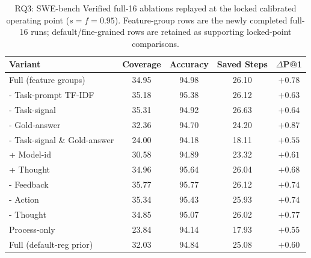 
\begin{table}[t]
\centering
\caption{RQ3: SWE-bench Verified full-16 ablations replayed at the locked calibrated operating point ($s=f=0.95$). Feature-group rows are the newly completed full-16 runs; default/fine-grained rows are retained as supporting locked-point comparisons.}
\label{tab:rq3_ablation}
\small
\setlength{\tabcolsep}{4pt}
\begin{tabular}{l c c c c}
\toprule
Variant & Coverage & Accuracy & Saved Steps & $\Delta$P@1 \\
\midrule
Full (feature groups) & 34.95 & 94.98 & 26.10 & $+0.78$ \\
- Task-prompt TF-IDF & 35.18 & 95.38 & 26.12 & $+0.63$ \\
- Task-signal & 35.31 & 94.92 & 26.63 & $+0.64$ \\
- Gold-answer & 32.36 & 94.70 & 24.20 & $+0.87$ \\
- Task-signal \& Gold-answer & 24.00 & 94.18 & 18.11 & $+0.55$ \\
+ Model-id & 30.58 & 94.89 & 23.32 & $+0.61$ \\
+ Thought & 34.96 & 95.64 & 26.04 & $+0.68$ \\
- Feedback & 35.77 & 95.77 & 26.12 & $+0.74$ \\
- Action & 35.34 & 95.43 & 25.93 & $+0.74$ \\
- Thought & 34.85 & 95.07 & 26.02 & $+0.77$ \\
Process-only & 23.84 & 94.14 & 17.93 & $+0.55$ \\
Full (default-reg prior) & 32.03 & 94.84 & 25.08 & $+0.60$ \\
\bottomrule
\end{tabular}
\end{table}
